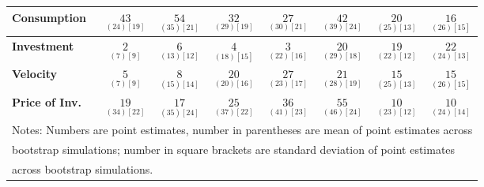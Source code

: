 \documentclass{article}
\begin{document}
\begin{tabular}{|l|c|@{}c|c|@{}c|c|@{}c|c|}
 \textbf{Consumption} & $\underset{( 24) [ 19]}{ 43}$ & $\underset{( 35) [ 21]}{ 54}$ & $\underset{( 29) [ 19]}{ 32}$ & $\underset{( 30) [ 21]}{ 27}$ & $\underset{( 39) [ 24]}{ 42}$ & $\underset{( 25) [ 13]}{ 20}$ & $\underset{( 26) [ 15]}{ 16}$ \\ \hline 
 \textbf{Investment} & $\underset{(  7) [  9]}{  2}$ & $\underset{( 13) [ 12]}{  6}$ & $\underset{( 18) [ 15]}{  4}$ & $\underset{( 22) [ 16]}{  3}$ & $\underset{( 29) [ 18]}{ 20}$ & $\underset{( 22) [ 12]}{ 19}$ & $\underset{( 24) [ 13]}{ 22}$ \\ \hline 
 \textbf{Velocity} & $\underset{(  7) [  9]}{  5}$ & $\underset{( 15) [ 14]}{  8}$ & $\underset{( 20) [ 16]}{ 20}$ & $\underset{( 23) [ 17]}{ 27}$ & $\underset{( 28) [ 19]}{ 21}$ & $\underset{( 25) [ 13]}{ 15}$ & $\underset{( 26) [ 15]}{ 15}$ \\ \hline 
 \textbf{Price of Inv.} & $\underset{( 34) [ 22]}{ 19}$ & $\underset{( 35) [ 24]}{ 17}$ & $\underset{( 37) [ 22]}{ 25}$ & $\underset{( 41) [ 23]}{ 36}$ & $\underset{( 46) [ 24]}{ 55}$ & $\underset{( 23) [ 12]}{ 10}$ & $\underset{( 24) [ 14]}{ 10}$ \\ \hline 
 \multicolumn{8}{|l|}{Notes: Numbers are point estimates, number in 
 parentheses are mean of point estimates across} \\ \hline 
 \multicolumn{8}{|l|}{bootstrap simulations; number in square brackets are 
 standard deviation of point estimates} \\ \hline 
 \multicolumn{8}{|l|}{across bootstrap simulations.} \\ \hline 
 \end{tabular} 
\end{document}
